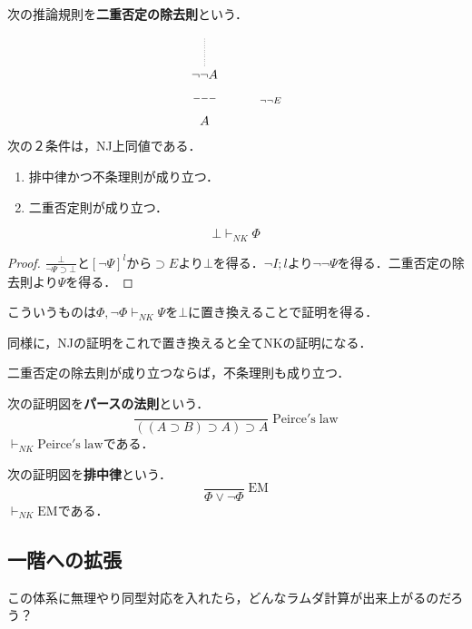 \documentclass[uplatex, 12pt, dvipdfmx]{jsreport}
\begin{document}
\begin{proposition}
    次の推論規則を\textbf{二重否定の除去則}という．
    \[
        \xymatrix{
            {}\ar@{.}[d]&\\{\lnot\lnot A}\ar@{}[d]|{---}&{}\ar@{}[d]^-{\lnot\lnot E}
            \\A&{}
        }
    \]
    次の２条件は，NJ上同値である．
    \begin{enumerate}
        \item 排中律かつ不条理則が成り立つ．
        \item 二重否定則が成り立つ．
    \end{enumerate}
\end{proposition}

\begin{proposition}[二重否定の除去則は不条理則よりも強い]
    \[\bot\vdash_{NK}\Phi\]
\end{proposition}
\begin{proof}
    $\frac{\bot}{\lnot\Psi\supset\bot}$と$[\lnot\Psi]^l$から$\supset E$より$\bot$を得る．$\lnot I;l$より$\lnot\lnot\Psi$を得る．二重否定の除去則より$\Psi$を得る．
\end{proof}
\begin{remark}
    こういうものは$\Phi,\lnot\Phi\vdash_{NK}\Psi$を$\bot$に置き換えることで証明を得る．

    同様に，NJの証明をこれで置き換えると全てNKの証明になる．
\end{remark}

\begin{proposition}[二重否定の除去則]
    二重否定の除去則が成り立つならば，不条理則も成り立つ．
\end{proposition}

\begin{proposition}
    次の証明図を\textbf{パースの法則}という．
    \[ \frac{}{((A\supset B)\supset A)\supset A}\;\mathrm{Peirce's\;law} \]
    $\vdash_{NK}\mathrm{Peirce's\;law}$である．
\end{proposition}

\begin{proposition}
    次の証明図を\textbf{排中律}という．
    \[ \frac{}{\Phi\lor\lnot\Phi}\;\mathrm{EM} \]
    $\vdash_{NK}\mathrm{EM}$である．
\end{proposition}

\subsection{一階への拡張}
この体系に無理やり同型対応を入れたら，どんなラムダ計算が出来上がるのだろう？
\end{document}
